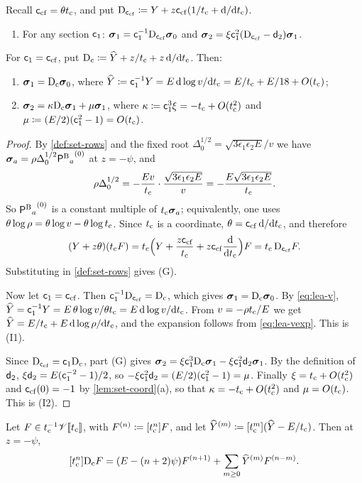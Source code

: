 \begin{lem}\label{lem:lea-conj}
Recall $\ccf=\theta\tc$, and put $\leaDg\coloneqq Y+z\ccf(1/\tc+\dd/\dd\tc)$.
\begin{enumerate}
\item[(G)] For any section $\cone$: $\brow_1=\cone^{-1}\leaDg\brow_0$ and $\brow_2=\xi\cone^2(\leaDg-\dtwo)\brow_1$.
\end{enumerate}
For $\cone=\ccf$, put $\leaDc\coloneqq\Yh+z/\tc+z\,\dd/\dd\tc$. Then:
\begin{enumerate}
\item[(I1)] $\brow_1=\leaDc\brow_0$, where $\Yh\coloneqq\cone^{-1}Y=E\,\dd\log v/\dd\tc=E/\tc+E/18+O(\tc)$;
\item[(I2)] $\brow_2=\kappa\leaDc\brow_1+\mu\brow_1$, where $\kappa\coloneqq\cone^3\xi=-\tc+O(\tc^2)$ and $\mu\coloneqq(E/2)(\cone^2-1)=O(\tc)$.
\end{enumerate}
\end{lem}

\begin{proof}
By \cref{def:set-rows} and the fixed root $\Delta_0^{1/2}=\sqrt{3\epsilon_1\epsilon_2E}/v$ we have $\brow_a=\rho\Delta_0^{1/2}{\PB_a}^{(0)}$ at $z=-\psi$, and
\[
\rho\Delta_0^{1/2}=-\frac{Ev}{\tc}\cdot\frac{\sqrt{3\epsilon_1\epsilon_2E}}{v}=-\frac{E\sqrt{3\epsilon_1\epsilon_2E}}{\tc}.
\]
So ${\PB_a}^{(0)}$ is a constant multiple of $\tc\brow_a$; equivalently, one uses $\theta\log\rho=\theta\log v-\theta\log\tc$. Since $\tc$ is a coordinate, $\theta=\ccf\,\dd/\dd\tc$, and therefore
\[
(Y+z\theta)(\tc F)=\tc\Bigl(Y+\frac{z\ccf}{\tc}+z\ccf\frac{\dd}{\dd\tc}\Bigr)F=\tc\,\leaDg F.
\]
Substituting in \cref{def:set-rows} gives (G).

Now let $\cone=\ccf$. Then $\cone^{-1}\leaDg=\leaDc$, which gives $\brow_1=\leaDc\brow_0$. By \cref{eq:lea-v}, $\Yh=\cone^{-1}Y=E\,\theta\log v/\theta\tc=E\,\dd\log v/\dd\tc$. From $v=-\rho\tc/E$ we get $\Yh=E/\tc+E\,\dd\log\rho/\dd\tc$, and the expansion follows from \cref{eq:lea-vexp}. This is (I1).

Since $\leaDg=\cone\leaDc$, part (G) gives $\brow_2=\xi\cone^3\leaDc\brow_1-\xi\cone^2\dtwo\brow_1$. By the definition of $\dtwo$, $\xi\dtwo=E(\cone^{-2}-1)/2$, so $-\xi\cone^2\dtwo=(E/2)(\cone^2-1)=\mu$. Finally $\xi=\tc+O(\tc^2)$ and $\ccf(0)=-1$ by \cref{lem:set-coord}(a), so that $\kappa=-\tc+O(\tc^2)$ and $\mu=O(\tc)$. This is (I2).
\end{proof}

\begin{lem}\label{lem:lea-Dc}
Let $F\in\tc^{-1}\leaV\fps{\tc}$, with $F^{(n)}\coloneqq[\tc^n]F$, and let $\Yh^{(m)}\coloneqq[\tc^m](\Yh-E/\tc)$. Then at $z=-\psi$,
\[
[\tc^n]\leaDc F=(E-(n+2)\psi)F^{(n+1)}+\sum_{m\ge0}\Yh^{(m)}F^{(n-m)}.
\]
\end{lem}

